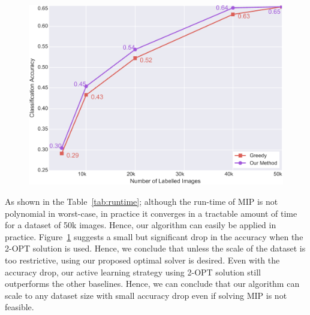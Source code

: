 \documentclass{article} %
\begin{document}
\begin{figure}[tb]
\begin{minipage}[t]{0.49\textwidth}
\end{minipage} \quad
\begin{minipage}[t]{0.49\textwidth}
\vspace{-50mm}
\vspace{-2mm}
\setlength{\tabcolsep}{1mm}
\label{tab:runtime}

\vspace{4mm}

\includegraphics[width=\textwidth]{mip_100_3.pdf}
\vspace{-2mm}
\label{fig:twoopt}
\end{minipage}
\end{figure}


As shown in the Table~\ref{tab:runtime}; although the run-time of MIP is not polynomial in worst-case, in practice it
converges in a tractable amount of time for a dataset of 50k images. Hence, our algorithm can easily be applied in
practice. Figure~\ref{fig:twoopt} suggests a small but significant drop in the accuracy when the 2-OPT solution is used.
Hence, we conclude that unless the scale of the dataset is too restrictive, using our proposed optimal solver is
desired. Even with the accuracy drop, our active learning strategy using 2-OPT solution still outperforms the other
baselines. Hence, we can conclude that our algorithm can scale to any dataset size with small accuracy drop even if
solving MIP is not feasible.
\end{document}
